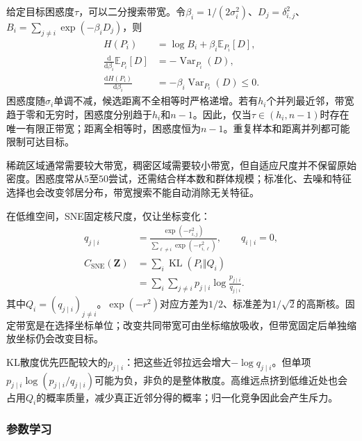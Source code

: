 给定目标困惑度$\tau$，可以二分搜索带宽。令$\beta_i=1/(2\sigma_i^2)$、$D_j=\delta_{i,j}^2$、$B_i=\sum_{j\ne i}\exp(-\beta_iD_j)$，则
\begin{equation}
  \label{eq:dim-sne-entropy-monotonicity}
  \begin{aligned}
    H(P_i)&=\log B_i+\beta_i\mathbb{E}_{P_i}[D],\\
    \frac{\mathrm{d}}{\mathrm{d}\beta_i}\mathbb{E}_{P_i}[D]
      &=-\operatorname{Var}_{P_i}(D),\\
    \frac{\mathrm{d}H(P_i)}{\mathrm{d}\beta_i}
      &=-\beta_i\operatorname{Var}_{P_i}(D)\leq 0.
  \end{aligned}
\end{equation}
困惑度随$\sigma_i$单调不减，候选距离不全相等时严格递增。若有$h_i$个并列最近邻，带宽趋于零和无穷时，困惑度分别趋于$h_i$和$n-1$。因此，仅当$\tau\in(h_i,n-1)$时存在唯一有限正带宽；距离全相等时，困惑度恒为$n-1$。重复样本和距离并列都可能限制可达目标。

稀疏区域通常需要较大带宽，稠密区域需要较小带宽，但自适应尺度并不保留原始密度。困惑度常从$5$至$50$尝试，还需结合样本数和群体规模；标准化、去噪和特征选择也会改变邻居分布，带宽搜索不能自动消除无关特征。

在低维空间，SNE固定核尺度，仅让坐标变化：
\begin{equation}
  \label{eq:dim-sne-low-loss}
  \begin{aligned}
    q_{j\mid i}
      &=\frac{\exp(-r_{i,j}^2)}
      {\sum_{\ell\ne i}\exp(-r_{i,\ell}^2)},\qquad q_{i\mid i}=0,\\
    C_{\mathrm{SNE}}(\bm{Z})
      &=\sum_i\operatorname{KL}(P_i\Vert Q_i)\\
      &=\sum_i\sum_{j\ne i}p_{j\mid i}
        \log\frac{p_{j\mid i}}{q_{j\mid i}}.
  \end{aligned}
\end{equation}
其中$Q_i=(q_{j\mid i})_{j\ne i}$。$\exp(-r^2)$对应方差为$1/2$、标准差为$1/\sqrt{2}$的高斯核。固定带宽是在选择坐标单位；改变共同带宽可由坐标缩放吸收，但带宽固定后单独缩放坐标仍会改变目标。

KL散度优先匹配较大的$p_{j\mid i}$：把这些近邻拉远会增大$-\log q_{j\mid i}$。但单项$p_{j\mid i}\log(p_{j\mid i}/q_{j\mid i})$可能为负，非负的是整体散度。高维远点挤到低维近处也会占用$Q_i$的概率质量，减少真正近邻分得的概率；归一化竞争因此会产生斥力。

\subsubsection{参数学习}

